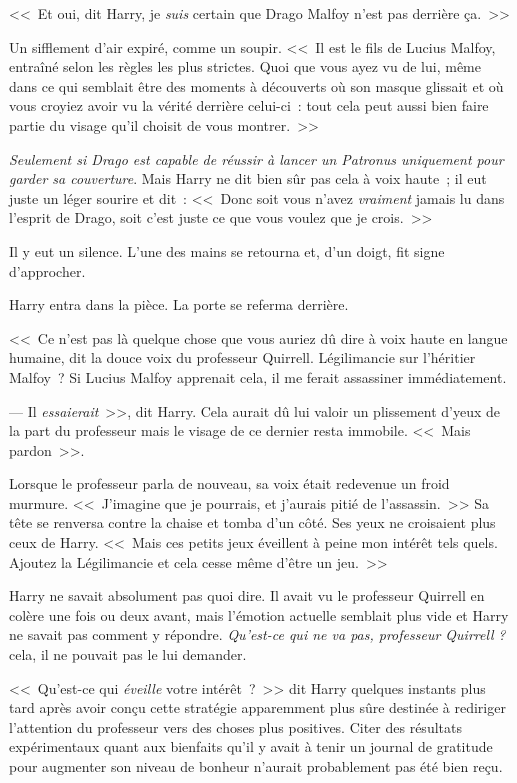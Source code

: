<<~Et oui, dit Harry, je \emph{suis} certain que Drago Malfoy n'est pas derrière ça.~>>

Un sifflement d'air expiré, comme un soupir. <<~Il est le fils de Lucius Malfoy, entraîné selon les règles les plus strictes. Quoi que vous ayez vu de lui, même dans ce qui semblait être des moments à découverts où son masque glissait et où vous croyiez avoir vu la vérité derrière celui-ci~: tout cela peut aussi bien faire partie du visage qu'il choisit de vous montrer.~>>

\emph{Seulement si Drago est capable de réussir à lancer un Patronus uniquement pour garder sa couverture}. Mais Harry ne dit bien sûr pas cela à voix haute~; il eut juste un léger sourire et dit~: <<~Donc soit vous n'avez \emph{vraiment} jamais lu dans l'esprit de Drago, soit c'est juste ce que vous voulez que je crois.~>>

Il y eut un silence. L'une des mains se retourna et, d'un doigt, fit signe d'approcher.

Harry entra dans la pièce. La porte se referma derrière.

<<~Ce n'est pas là quelque chose que vous auriez dû dire à voix haute en langue humaine, dit la douce voix du professeur Quirrell. Légilimancie sur l'héritier Malfoy~? Si Lucius Malfoy apprenait cela, il me ferait assassiner immédiatement.

--- Il \emph{essaierait}~>>, dit Harry. Cela aurait dû lui valoir un plissement d'yeux de la part du professeur mais le visage de ce dernier resta immobile. <<~Mais pardon~>>.

Lorsque le professeur parla de nouveau, sa voix était redevenue un froid murmure. <<~J'imagine que je pourrais, et j'aurais pitié de l'assassin.~>> Sa tête se renversa contre la chaise et tomba d'un côté. Ses yeux ne croisaient plus ceux de Harry. <<~Mais ces petits jeux éveillent à peine mon intérêt tels quels. Ajoutez la Légilimancie et cela cesse même d'être un jeu.~>>

Harry ne savait absolument pas quoi dire. Il avait vu le professeur Quirrell en colère une fois ou deux avant, mais l'émotion actuelle semblait plus vide et Harry ne savait pas comment y répondre. \emph{Qu'est-ce qui ne va pas, professeur Quirrell} \emph{?} cela, il ne pouvait pas le lui demander.

<<~Qu'est-ce qui \emph{éveille} votre intérêt~?~>> dit Harry quelques instants plus tard après avoir conçu cette stratégie apparemment plus sûre destinée à rediriger l'attention du professeur vers des choses plus positives. Citer des résultats expérimentaux quant aux bienfaits qu'il y avait à tenir un journal de gratitude pour augmenter son niveau de bonheur n'aurait probablement pas été bien reçu.

